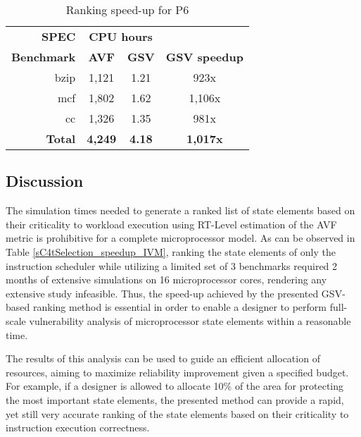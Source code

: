 \documentclass[12pt]{yalephd}
\begin{document}
\begin{table}[!ht]
\begin{center}
\begin{threeparttable}[b]
\caption{Ranking speed-up for P6}\label{sC4tSelection_speedup_P6}
\begin{tabular}{||r|c|c|c||}
\hline
\hline
{\bf SPEC }     & \multicolumn{2}{|c|}{\bf CPU hours}    &                    \\
{\bf Benchmark} &        {\bf AVF} & {\bf GSV}  & {\bf GSV speedup} \\
\hline
bzip        & 1,121 & 1.21 &   923x\\
mcf         & 1,802 & 1.62 & 1,106x\\
cc          & 1,326 & 1.35 &   981x\\
\hline
{\bf Total} & {\bf 4,249} & {\bf 4.18} & {\bf 1,017x} \\
\hline
\hline
\end{tabular}
\end{threeparttable}
\end{center}
\end{table}

\subsection{Discussion}

The simulation times needed to generate a ranked list of state elements based on their criticality to workload execution using RT-Level estimation of the AVF metric \cite{WMP07} is prohibitive for a complete microprocessor model. As can be observed in Table \ref{sC4tSelection_speedup_IVM}, ranking the state elements of only the instruction scheduler while utilizing a limited set of 3 benchmarks required 2 months of extensive simulations on 16 microprocessor cores, rendering any extensive study infeasible. Thus, the speed-up achieved by the presented GSV-based ranking method is essential in order to enable a designer to perform full-scale vulnerability analysis of microprocessor state elements within a reasonable time.

The results of this analysis can be used to guide an efficient allocation of resources, aiming to maximize reliability improvement given a specified budget. For example, if a designer is allowed to allocate 10\% of the area for protecting the most important state elements, the presented method can provide a rapid, yet still very accurate ranking of the state elements based on their criticality to instruction execution correctness.
\end{document}
